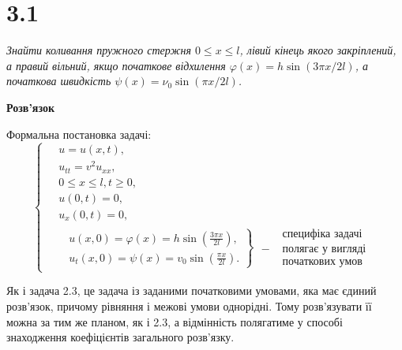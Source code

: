 

%


\section[Задача №3.1]{3.1}

\textit{Знайти коливання пружного стержня $0 \leq x \leq l$, лівий кінець якого закріплений, а правий вільний, якщо початкове відхилення $\varphi(x) = h \sin(3\pi x/2l)$, а початкова швидкість $\psi(x) = \nu_0 \sin(\pi x/2l)$.}

\begin{center}
    \textbf{Розв'язок}
\end{center}
Формальна постановка задачі:
\begin{equation} \label{cond3.1}
    \left\{ \begin{aligned}
        &\;u = u(x,t), \\
        &\;u_{tt} = v^2 u_{xx}, \\
        &\;0 \leq x \leq l, t \geq 0, \\
        &\;u(0,t) = 0,\\
        &\;u_x(0,t) = 0,\\
        &\left.\begin{aligned}
            &u(x,0) = \varphi(x) = h \sin \left(\frac{3 \pi x}{2 l} \right), \\ 
            &u_t(x,0) = \psi(x) = v_0 \sin \left(\frac{\pi x}{2 l}\right).
        \end{aligned}\right\} \; 
        \begin{aligned}
            &\text{ специфіка задачі} \\
          - &\text{ полягає у вигляді } \\
            &\text{ початкових умов } 
        \end{aligned}
    \end{aligned} \right.
\end{equation}

Як і задача 2.3, це задача із заданими початковими умовами, яка має єдиний розв'язок, причому рівняння і межові умови однорідні. Тому розв'язувати її можна за тим же планом, як і 2.3, а відмінність полягатиме у способі знаходження коефіцієнтів загального розв'язку.

